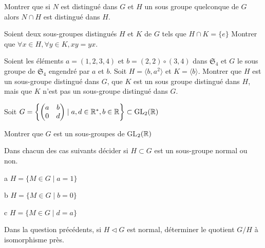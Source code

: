 \documentclass{report}
\begin{document}
\begin{exo}
    Montrer que si \(N\) est distingué dans \(G\) et \(H\) un sous groupe quelconque de
    \(G\) alors \(N\cap H\) est distingué dans \(H\).
\end{exo}

\begin{exo}
    Soient deux sous-groupes distingués \(H\) et \(K\) de \(G\) tels que \(H\cap K=\{e\}\)
    Montrer que \(\forall x\in H,\forall y\in K, xy=yx\).
\end{exo}

\begin{exo}
    Soient les éléments \(a=(1,2,3,4)\) et \(b=(2,2)\circ(3,4)\) dans \(\mathfrak{S}_4\)
    et \(G\) le sous groupe de \(\mathfrak{S}_4\) engendré par \(a\) et \(b\). Soit
    \(H=\langle b,a^2\rangle\) et \(K=\langle b\rangle\). Montrer que \(H\) est un sous-groupe
    distingué dans \(G\), que \(K\) est un sous groupe distingué dans \(H\), mais que
    \(K\) n'est pas un sous-groupe distingué dans \(G\).
\end{exo}

\begin{exo}
    Soit \(G=\left\{\begin{pmatrix}a&b\\0&d\end{pmatrix}\mid a,d\in\mathbb{R}^*, b\in\mathbb{R}
    \right\}\subset \text{GL}_2(\mathbb{R})\)
    \begin{q}{1}
        Montrer que \(G\) est un sous-groupes de GL\(_2(\mathbb{R})\)
    \end{q}
    \begin{q}{2}
        Dans chacun des cas suivants décider si \(H\subset G\) est un sous-groupe
        normal ou non.
        \begin{q}{a}
            \(H=\{M \in G \mid a = 1\}\)
        \end{q}
        \begin{q}{b}
            \(H=\{M \in G \mid b = 0\}\)
        \end{q}
        \begin{q}{c}
            \(H=\{M \in G \mid d = a\}\)
        \end{q}
    \end{q}
    \begin{q}{3}
        Dans la question précédents, si \(H\triangleleft G\) est normal, déterminer
        le quotient \(G/H\) à isomorphisme près.
    \end{q}
\end{exo}
\end{document}

